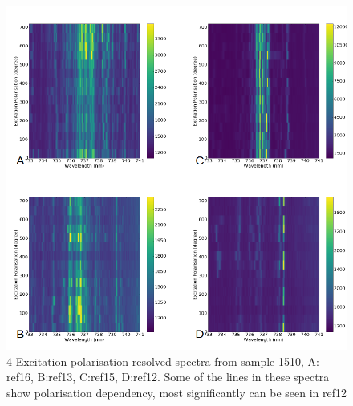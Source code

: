 \begin{figure}[h]
\centering
\includegraphics[width=1\linewidth]{Figures/pic/polarisationexcitation}
\caption{4 Excitation polarisation-resolved spectra from sample 1510, A: ref16, B:ref13, C:ref15, D:ref12. Some of the lines in these spectra show polarisation dependency, most significantly can be seen in ref12 }
\label{fig:polarisationexcitation}
\end{figure}
 
